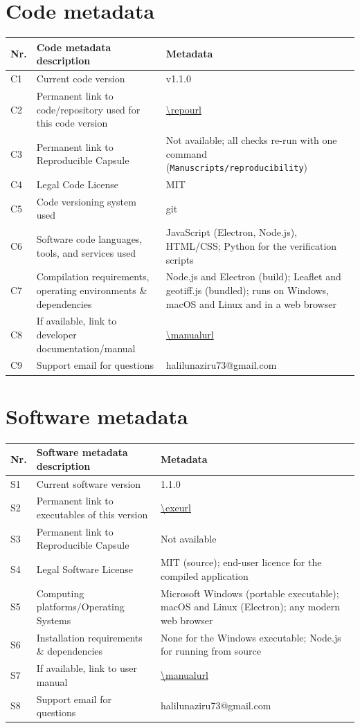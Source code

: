 \documentclass[preprint,12pt]{elsarticle}
\begin{document}
\section*{Code metadata}
\begin{table}[H]\centering\small
\begin{tabularx}{\textwidth}{lp{5.2cm}X}
\toprule
Nr. & Code metadata description & Metadata\\\midrule
C1 & Current code version & v1.1.0\\
C2 & Permanent link to code/repository used for this code version & \url{\repourl}\\
C3 & Permanent link to Reproducible Capsule & Not available; all checks re-run with one command (\texttt{Manuscripts/reproducibility})\\
C4 & Legal Code License & MIT\\
C5 & Code versioning system used & git\\
C6 & Software code languages, tools, and services used & JavaScript (Electron, Node.js), HTML/CSS; Python for the verification scripts\\
C7 & Compilation requirements, operating environments \& dependencies & Node.js and Electron (build); Leaflet and geotiff.js (bundled); runs on Windows, macOS and Linux and in a web browser\\
C8 & If available, link to developer documentation/manual & \url{\manualurl}\\
C9 & Support email for questions & halilunaziru73@gmail.com\\\bottomrule
\end{tabularx}
\end{table}

\section*{Software metadata}
\begin{table}[H]\centering\small
\begin{tabularx}{\textwidth}{lp{5.2cm}X}
\toprule
Nr. & Software metadata description & Metadata\\\midrule
S1 & Current software version & 1.1.0\\
S2 & Permanent link to executables of this version & \url{\exeurl}\\
S3 & Permanent link to Reproducible Capsule & Not available\\
S4 & Legal Software License & MIT (source); end-user licence for the compiled application\\
S5 & Computing platforms/Operating Systems & Microsoft Windows (portable executable); macOS and Linux (Electron); any modern web browser\\
S6 & Installation requirements \& dependencies & None for the Windows executable; Node.js for running from source\\
S7 & If available, link to user manual & \url{\manualurl}\\
S8 & Support email for questions & halilunaziru73@gmail.com\\\bottomrule
\end{tabularx}
\end{table}
\end{document}
